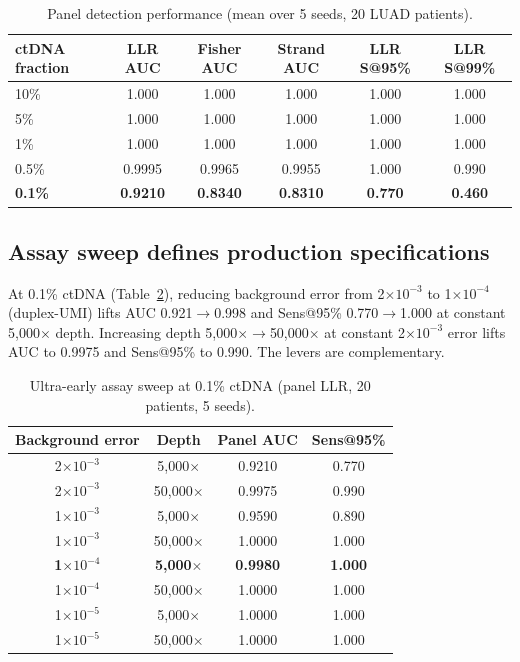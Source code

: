\documentclass[11pt]{article}
\begin{document}
\begin{table}[ht]
\centering
\caption{Panel detection performance (mean over 5 seeds, 20 LUAD patients).}
\label{tab:panel}
\begin{tabular}{lccccc}
\toprule
ctDNA fraction & LLR AUC & Fisher AUC & Strand AUC & LLR S@95\% & LLR S@99\% \\
\midrule
10\% & 1.000 & 1.000 & 1.000 & 1.000 & 1.000 \\
5\% & 1.000 & 1.000 & 1.000 & 1.000 & 1.000 \\
1\% & 1.000 & 1.000 & 1.000 & 1.000 & 1.000 \\
0.5\% & 0.9995 & 0.9965 & 0.9955 & 1.000 & 0.990 \\
\textbf{0.1\%} & \textbf{0.9210} & \textbf{0.8340} & \textbf{0.8310} & \textbf{0.770} & \textbf{0.460} \\
\bottomrule
\end{tabular}
\end{table}

\subsection{Assay sweep defines production specifications}

At 0.1\% ctDNA (Table~\ref{tab:sweep}), reducing background error from 2$\times10^{-3}$ to 1$\times10^{-4}$ (duplex-UMI) lifts AUC 0.921$\to$0.998 and Sens@95\% 0.770$\to$1.000 at constant 5,000$\times$ depth. Increasing depth 5,000$\times$$\to$50,000$\times$ at constant 2$\times10^{-3}$ error lifts AUC to 0.9975 and Sens@95\% to 0.990. The levers are complementary.

\begin{table}[ht]
\centering
\caption{Ultra-early assay sweep at 0.1\% ctDNA (panel LLR, 20 patients, 5 seeds).}
\label{tab:sweep}
\begin{tabular}{cccc}
\toprule
Background error & Depth & Panel AUC & Sens@95\% \\
\midrule
2$\times10^{-3}$ & 5,000$\times$ & 0.9210 & 0.770 \\
2$\times10^{-3}$ & 50,000$\times$ & 0.9975 & 0.990 \\
1$\times10^{-3}$ & 5,000$\times$ & 0.9590 & 0.890 \\
1$\times10^{-3}$ & 50,000$\times$ & 1.0000 & 1.000 \\
\textbf{1$\times10^{-4}$} & \textbf{5,000$\times$} & \textbf{0.9980} & \textbf{1.000} \\
1$\times10^{-4}$ & 50,000$\times$ & 1.0000 & 1.000 \\
1$\times10^{-5}$ & 5,000$\times$ & 1.0000 & 1.000 \\
1$\times10^{-5}$ & 50,000$\times$ & 1.0000 & 1.000 \\
\bottomrule
\end{tabular}
\end{table}
\end{document}
